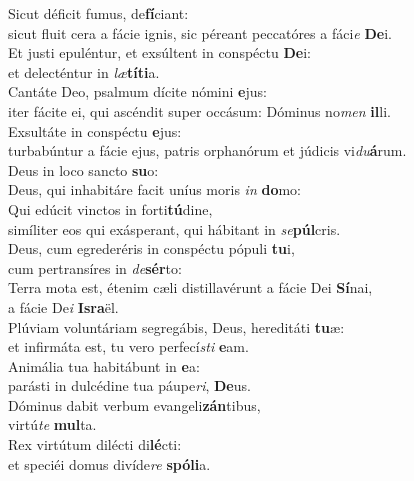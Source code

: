 \evenverse Sicut déficit fumus, de\textbf{fí}ciant:~\*\\
\evenverse sicut fluit cera a fácie ignis, sic péreant peccatóres a fáci\textit{e} \textbf{De}i.\\
\oddverse Et justi epuléntur, et exsúltent in conspéctu \textbf{De}i:~\*\\
\oddverse et delecténtur in \textit{læ}\textbf{tí}\textbf{ti}a.\\
\evenverse Cantáte Deo, psalmum dícite nómini \textbf{e}jus:~\*\\
\evenverse iter fácite ei, qui ascéndit super occásum: Dóminus no\textit{men} \textbf{il}li.\\
\oddverse Exsultáte in conspéctu \textbf{e}jus:~\*\\
\oddverse turbabúntur a fácie ejus, patris orphanórum et júdicis vi\textit{du}\textbf{á}rum.\\
\evenverse Deus in loco sancto \textbf{su}o:~\*\\
\evenverse Deus, qui inhabitáre facit uníus moris \textit{in} \textbf{do}mo:\\
\oddverse Qui edúcit vinctos in forti\textbf{tú}dine,~\*\\
\oddverse simíliter eos qui exásperant, qui hábitant in \textit{se}\textbf{púl}cris.\\
\evenverse Deus, cum egrederéris in conspéctu pópuli \textbf{tu}i,~\*\\
\evenverse cum pertransíres in \textit{de}\textbf{sér}to:\\
\oddverse Terra mota est, étenim cæli distillavérunt a fácie Dei \textbf{Sí}nai,~\*\\
\oddverse a fácie De\textit{i} \textbf{Is}\textbf{ra}ël.\\
\evenverse Plúviam voluntáriam segregábis, Deus, hereditáti \textbf{tu}æ:~\*\\
\evenverse et infirmáta est, tu vero perfecí\textit{sti} \textbf{e}am.\\
\oddverse Animália tua habitábunt in \textbf{e}a:~\*\\
\oddverse parásti in dulcédine tua páupe\textit{ri}, \textbf{De}us.\\
\evenverse Dóminus dabit verbum evangeli\textbf{zán}tibus,~\*\\
\evenverse virtú\textit{te} \textbf{mul}ta.\\
\oddverse Rex virtútum dilécti di\textbf{lé}cti:~\*\\
\oddverse et speciéi domus divíde\textit{re} \textbf{spó}\textbf{li}a.\\
